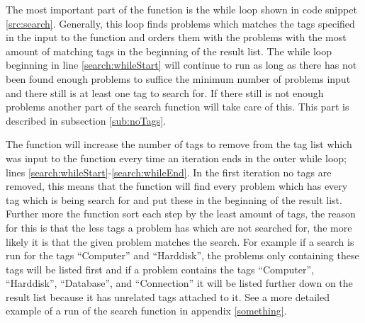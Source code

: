 The most important part of the  function is the while loop shown in code snippet \ref{src:search}.
Generally, this loop finds problems which matches the tags specified in the input to the function and orders them with the problems with the most amount of matching tags in the beginning of the result list.
The while loop beginning in line \ref{search:whileStart} will continue to run as long as there has not been found enough problems to suffice the minimum number of problems input and there still is at least one tag to search for.
If there still is not enough problems another part of the search function will take care of this.
This part is described in subsection \ref{sub:noTags}.

The function will increase the number of tags to remove from the tag list which was input to the function every time an iteration ends in the outer while loop; lines \ref{search:whileStart}-\ref{search:whileEnd}.
In the first iteration no tags are removed, this means that the function will find every problem which has every tag which is being search for and put these in the beginning of the result list.
Further more the function sort each step by the least amount of tags, the reason for this is that the less tags a problem has which are not searched for, the more likely it is that the given problem matches the search.
For example if a search is run for the tags ``Computer'' and ``Harddisk'', the problems only containing these tags will be listed first and if a problem contains the tags ``Computer'', ``Harddisk'', ``Database'', and ``Connection'' it will be listed further down on the result list because it has unrelated tags attached to it.
See a more detailed example of a run of the search function in appendix \ref{something}.

